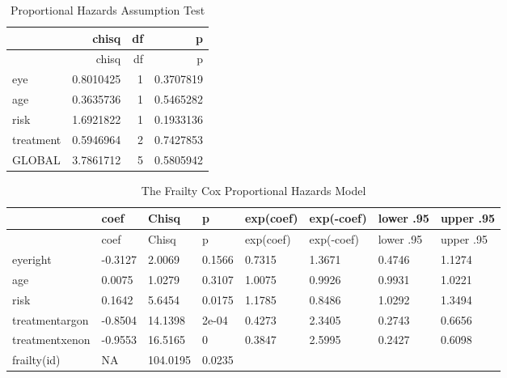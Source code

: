 \documentclass[
]{article}
\newenvironment{Shaded}{\begin{snugshade}}{\end{snugshade}}
\newcommand{\CommentTok}[1]{\textcolor[rgb]{0.56,0.35,0.01}{\textit{#1}}}
\newcommand{\DataTypeTok}[1]{\textcolor[rgb]{0.13,0.29,0.53}{#1}}
\newcommand{\DecValTok}[1]{\textcolor[rgb]{0.00,0.00,0.81}{#1}}
\newcommand{\KeywordTok}[1]{\textcolor[rgb]{0.13,0.29,0.53}{\textbf{#1}}}
\newcommand{\NormalTok}[1]{#1}
\newcommand{\OperatorTok}[1]{\textcolor[rgb]{0.81,0.36,0.00}{\textbf{#1}}}
\newcommand{\StringTok}[1]{\textcolor[rgb]{0.31,0.60,0.02}{#1}}
\begin{document}
\begin{longtable}[]{@{}lrrr@{}}
\caption{Proportional Hazards Assumption Test}\tabularnewline
\toprule
& chisq & df & p\tabularnewline
\midrule
\endfirsthead
\toprule
& chisq & df & p\tabularnewline
\midrule
\endhead
eye & 0.8010425 & 1 & 0.3707819\tabularnewline
age & 0.3635736 & 1 & 0.5465282\tabularnewline
risk & 1.6921822 & 1 & 0.1933136\tabularnewline
treatment & 0.5946964 & 2 & 0.7427853\tabularnewline
GLOBAL & 3.7861712 & 5 & 0.5805942\tabularnewline
\bottomrule
\end{longtable}

\begin{Shaded}
\end{Shaded}

\begin{longtable}[]{@{}llllllll@{}}
\caption{The Frailty Cox Proportional Hazards Model}\tabularnewline
\toprule
& coef & Chisq & p & exp(coef) & exp(-coef) & lower .95 & upper
.95\tabularnewline
\midrule
\endfirsthead
\toprule
& coef & Chisq & p & exp(coef) & exp(-coef) & lower .95 & upper
.95\tabularnewline
\midrule
\endhead
eyeright & -0.3127 & 2.0069 & 0.1566 & 0.7315 & 1.3671 & 0.4746 &
1.1274\tabularnewline
age & 0.0075 & 1.0279 & 0.3107 & 1.0075 & 0.9926 & 0.9931 &
1.0221\tabularnewline
risk & 0.1642 & 5.6454 & 0.0175 & 1.1785 & 0.8486 & 1.0292 &
1.3494\tabularnewline
treatmentargon & -0.8504 & 14.1398 & 2e-04 & 0.4273 & 2.3405 & 0.2743 &
0.6656\tabularnewline
treatmentxenon & -0.9553 & 16.5165 & 0 & 0.3847 & 2.5995 & 0.2427 &
0.6098\tabularnewline
frailty(id) & NA & 104.0195 & 0.0235 & & & &\tabularnewline
\bottomrule
\end{longtable}
\end{document}
